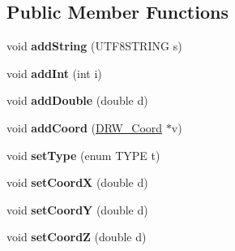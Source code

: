 \subsection*{Public Member Functions}
\begin{DoxyCompactItemize}
\item 
\hypertarget{classDRW__Variant_a0182b38c36ec2fa06994801cdde232fc}{void {\bfseries add\-String} (U\-T\-F8\-S\-T\-R\-I\-N\-G s)}\label{classDRW__Variant_a0182b38c36ec2fa06994801cdde232fc}

\item 
\hypertarget{classDRW__Variant_a48547d073518b2c03834a734eca3b55e}{void {\bfseries add\-Int} (int i)}\label{classDRW__Variant_a48547d073518b2c03834a734eca3b55e}

\item 
\hypertarget{classDRW__Variant_a7e05643e571b0472a6eeb28f7d0b7707}{void {\bfseries add\-Double} (double d)}\label{classDRW__Variant_a7e05643e571b0472a6eeb28f7d0b7707}

\item 
\hypertarget{classDRW__Variant_a5bbbef161382f58c67966ddcaef7ca56}{void {\bfseries add\-Coord} (\hyperlink{classDRW__Coord}{D\-R\-W\-\_\-\-Coord} $\ast$v)}\label{classDRW__Variant_a5bbbef161382f58c67966ddcaef7ca56}

\item 
\hypertarget{classDRW__Variant_ab737a71f74784df3fe72157c96deb9d5}{void {\bfseries set\-Type} (enum T\-Y\-P\-E t)}\label{classDRW__Variant_ab737a71f74784df3fe72157c96deb9d5}

\item 
\hypertarget{classDRW__Variant_ad30771a7cf18482eaca1554d0dc057ce}{void {\bfseries set\-Coord\-X} (double d)}\label{classDRW__Variant_ad30771a7cf18482eaca1554d0dc057ce}

\item 
\hypertarget{classDRW__Variant_acd62938a8425994059b0d023195b56a8}{void {\bfseries set\-Coord\-Y} (double d)}\label{classDRW__Variant_acd62938a8425994059b0d023195b56a8}

\item 
\hypertarget{classDRW__Variant_a297e8f197757c615b286f1c832644bc4}{void {\bfseries set\-Coord\-Z} (double d)}\label{classDRW__Variant_a297e8f197757c615b286f1c832644bc4}

\end{DoxyCompactItemize}
